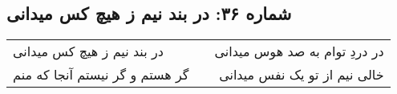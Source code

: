 \begin{center}
\section*{شماره ۳۶: در بند نیم ز هیچ کس میدانی}
\label{sec:036}
\begin{longtable}{l p{0.5cm} r}
در بند نیم ز هیچ کس میدانی
&&
در دردِ توام به صد هوس میدانی
\\
گر هستم و گر نیستم آنجا که منم
&&
خالی نیم از تو یک نفس میدانی
\\
\end{longtable}
\end{center}
